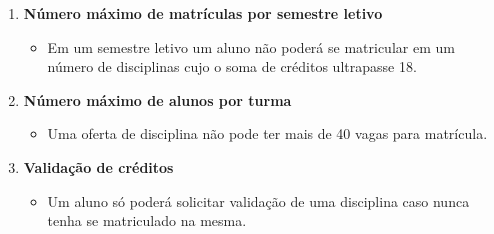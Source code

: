 \documentclass[11pt]{article}
\begin{document}
\begin{enumerate}
	\item \textbf{Número máximo de matrículas por semestre letivo}
	\begin{itemize}
		\item Em um semestre letivo um aluno não poderá se matricular em um número de disciplinas cujo o soma de créditos ultrapasse 18.
	\end{itemize}
	\item \textbf{Número máximo de alunos por turma}
	\begin{itemize}
		\item Uma oferta de disciplina não pode ter mais de 40 vagas para matrícula.
	\end{itemize}
	\item \textbf{Validação de créditos}
	\begin{itemize}
		\item Um aluno só poderá solicitar validação de uma disciplina caso nunca tenha se matriculado na mesma.
	\end{itemize}
\end{enumerate}









\end{document}
